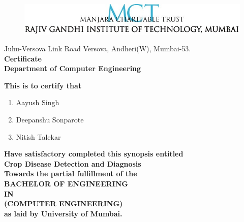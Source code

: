 \thispagestyle{empty}
\vspace*{0.025cm}
\begin{center}
\begin{figure}[h]
\centering
\includegraphics[scale=0.8]{college_logo.jpg}
\end{figure}
\vspace{0cm}
Juhu-Versova Link Road Versova, Andheri(W), Mumbai-53.\\
\vspace{1cm}
\huge\textbf{Certificate}\\
\vspace{0.25cm}
\hspace{.05cm}
\large\textbf {Department of Computer Engineering}\\
\end{center}
\vspace{0.50cm}
\begin{center}
\textbf{This is to certify that}\\
\end{center}
\vspace{0cm}

\begin{enumerate}
\item \begin{center}Aayush Singh\end{center}
\item \begin{center}Deepanshu Sonparote\end{center}
\item \begin{center}Nitish Talekar\end{center}
\end{enumerate}




\begin{center}
\textbf{Have satisfactory completed this synopsis entitled}\\
\vspace{0.70cm}
{\Large\textbf {Crop Disease Detection and Diagnosis}} \\
\vspace{0.50cm}
\textbf{Towards the partial fulfillment of the}\\
\vspace{0.20cm}
\textbf{BACHELOR OF ENGINEERING}\\
\textbf{IN}\\
\textbf{(COMPUTER ENGINEERING)}\\
\vspace{0.20cm}
\textbf{as laid by University of Mumbai.}\\
\end{center}
\vspace{1cm}


